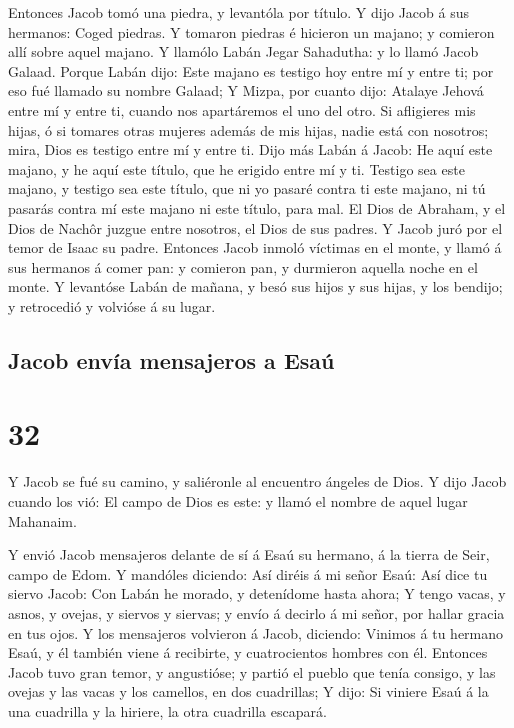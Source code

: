  Entonces Jacob tomó una piedra, y levantóla por título.
 Y dijo Jacob á sus hermanos: Coged piedras. Y tomaron
piedras é hicieron un majano; y comieron allí sobre aquel majano.
 Y llamólo Labán Jegar Sahadutha: y lo llamó Jacob
Galaad.  Porque Labán dijo: Este majano es testigo hoy
entre mí y entre ti; por eso fué llamado su nombre Galaad;
 Y Mizpa, por cuanto dijo: Atalaye Jehová entre mí y
entre ti, cuando nos apartáremos el uno del otro.  Si
afligieres mis hijas, ó si tomares otras mujeres además de mis hijas,
nadie está con nosotros; mira, Dios es testigo entre mí y entre ti.
 Dijo más Labán á Jacob: He aquí este majano, y he aquí
este título, que he erigido entre mí y ti.  Testigo sea
este majano, y testigo sea este título, que ni yo pasaré contra ti este
majano, ni tú pasarás contra mí este majano ni este título, para mal.
 El Dios de Abraham, y el Dios de Nachôr juzgue entre
nosotros, el Dios de sus padres. Y Jacob juró por el temor de Isaac su
padre.  Entonces Jacob inmoló víctimas en el monte, y
llamó á sus hermanos á comer pan: y comieron pan, y durmieron aquella
noche en el monte.  Y levantóse Labán de mañana, y besó
sus hijos y sus hijas, y los bendijo; y retrocedió y volvióse á su
lugar.

\hypertarget{jacob-envuxeda-mensajeros-a-esauxfa}{%
\subsection{Jacob envía mensajeros a
Esaú}\label{jacob-envuxeda-mensajeros-a-esauxfa}}

\hypertarget{section-01-32}{%
\section{32}\label{section-01-32}}

 Y Jacob se fué su camino, y saliéronle al encuentro
ángeles de Dios.  Y dijo Jacob cuando los vió: El campo de
Dios es este: y llamó el nombre de aquel lugar Mahanaim.

 Y envió Jacob mensajeros delante de sí á Esaú su hermano,
á la tierra de Seir, campo de Edom.  Y mandóles diciendo:
Así diréis á mi señor Esaú: Así dice tu siervo Jacob: Con Labán he
morado, y detenídome hasta ahora;  Y tengo vacas, y asnos,
y ovejas, y siervos y siervas; y envío á decirlo á mi señor, por hallar
gracia en tus ojos.  Y los mensajeros volvieron á Jacob,
diciendo: Vinimos á tu hermano Esaú, y él también viene á recibirte, y
cuatrocientos hombres con él.  Entonces Jacob tuvo gran
temor, y angustióse; y partió el pueblo que tenía consigo, y las ovejas
y las vacas y los camellos, en dos cuadrillas;  Y dijo: Si
viniere Esaú á la una cuadrilla y la hiriere, la otra cuadrilla
escapará.

